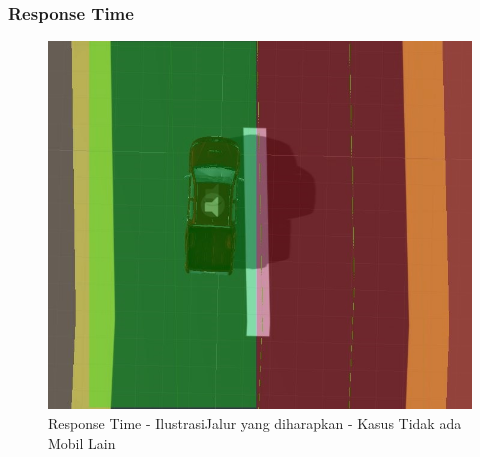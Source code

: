         \subsubsection{Response Time}
        
        \begin{figure}  [!htb]
	        \captionsetup{justification=centering}
	        \includegraphics[scale=0.5]{img/jalur-tnp-mobil.JPG}
	        \caption{Response Time - IlustrasiJalur yang diharapkan - Kasus Tidak ada Mobil Lain}
	        \label{fig: 3_20}
        \end{figure}
        
